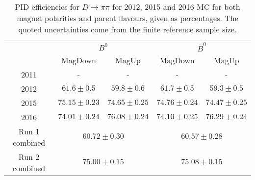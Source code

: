 \begin{table}[H]
    \centering
    \begin{tabular}{ccccc}
        \toprule
        & \multicolumn{2}{c}{$B^0$} &  \multicolumn{2}{c}{$\bar{B}^0$}\\
        & MagDown & MagUp & MagDown & MagUp\\
        \midrule
2011 & - & - & - & - \\
2012 & $61.6 \pm 0.5$ & $59.8 \pm 0.6$ & $61.7 \pm 0.5$ & $59.3 \pm 0.5$ \\
2015 & $75.15 \pm 0.23$ & $74.65 \pm 0.25$ & $74.76 \pm 0.24$ & $74.47 \pm 0.25$ \\
2016 & $74.01 \pm 0.24$ & $76.08 \pm 0.24$ & $74.10 \pm 0.25$ & $76.29 \pm 0.24$ \\
        \midrule
Run 1 combined & \multicolumn{2}{c}{$60.72 \pm 0.30$} & \multicolumn{2}{c}{$60.57 \pm 0.28$} \\
Run 2 combined & \multicolumn{2}{c}{$75.00 \pm 0.15$} & \multicolumn{2}{c}{$75.08 \pm 0.15$} \\
        \bottomrule
    \end{tabular}
    \caption{PID efficiencies for $D \to \pi\pi$ for 2012, 2015 and 2016 MC for both magnet polarities and parent flavours, given as percentages. The quoted  uncertainties come from the finite reference sample size.}
\label{tab:PID_efficiency_pipi}
\end{table}
